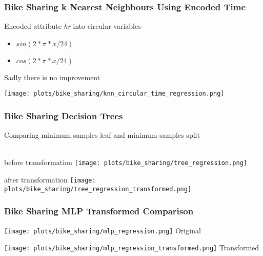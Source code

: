 \documentclass[aspectratio=169]{beamer}
\begin{document}
\begin{frame}{}
\frametitle{Bike Sharing k Nearest Neighbours Using Encoded Time}
\begin{minipage}{0.3\textwidth}
Encoded attribute \textit{hr} into circular variables\
\begin{itemize}
\item $sin(2*\pi*x/24)$
\item $cos(2*\pi*x/24)$
\end{itemize}
Sadly there is no improvement
\end{minipage}
\begin{minipage}{0.69\textwidth}
  \texttt{[image: plots/bike\_sharing/knn\_circular\_time\_regression.png]}
\end{minipage}
 
\end{frame}


\begin{frame}{}
\frametitle{Bike Sharing Decision Trees }
Comparing minimum samples leaf and minimum samples split\\~\\
\begin{minipage}{0.49\textwidth}
	\center before transformation
    \texttt{[image: plots/bike\_sharing/tree\_regression.png]}
\end{minipage}
\begin{minipage}{0.49\textwidth}
	\center after transformation
    \texttt{[image: plots/bike\_sharing/tree\_regression\_transformed.png]}
\end{minipage}
\end{frame}

\begin{frame}{}
\frametitle{Bike Sharing MLP Transformed Comparison}

\begin{minipage}{0.49\textwidth}
    \texttt{[image: plots/bike\_sharing/mlp\_regression.png]}
    \center Original
\end{minipage}
\begin{minipage}{0.49\textwidth}
    \texttt{[image: plots/bike\_sharing/mlp\_regression\_transformed.png]}
    \center Transformed
\end{minipage}
\end{frame}


\end{document}
